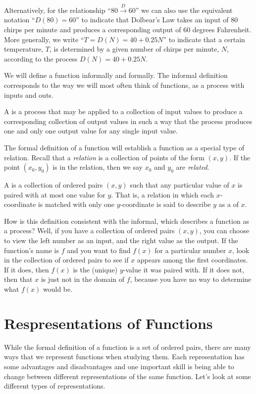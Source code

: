 \documentclass[noauthor, nooutcomes]{ximera}
\begin{document}
Alternatively, for the relationship ``$80 \xrightarrow{D} 60$'' we can also use the equivalent notation ``$D(80) = 60$'' to indicate that Dolbear's Law takes an input of $80$ chirps per minute and produces a corresponding output of $60$ degrees Fahrenheit.  More generally, we write ``$T = D(N) = 40 + 0.25N$'' to indicate that a certain temperature, $T$, is determined by a given number of chirps per minute, $N$, according to the process $D(N) = 40 + 0.25N$.


We will define a function informally and formally.  The informal definition corresponds to the way we will most often think of functions, as a process with inputs and outs.  

\begin{definition}
A  is a process that may be applied to a collection of input values to produce a corresponding collection of output values in such a way that the process produces one and only one output value for any single input value.
\end{definition}

The formal definition of a function will establish a function as a special type of relation.  Recall that a \emph{relation} is a collection of points of the form $(x,y)$.  If the point $(x_0,y_0)$ is in the relation, then we say $x_0$ and $y_0$ are \emph{related}.

\begin{definition}
A  is a collection of ordered pairs $(x,y)$ such that any particular value of $x$ is paired with at most one value for $y$. That is, a relation in which each $x$-coordinate is matched with only one $y$-coordinate is said to describe $y$ as a  of $x$.
\end{definition}

How is this definition consistent with the informal, which describes a function as a process? Well, if you have a collection of ordered pairs $(x,y)$, you can choose to view the left number as an input, and the right value as the output. If the function's name is $f$ and you want to find $f(x)$  for a particular number $x$, look in the collection of ordered pairs to see if $x$ appears among the first coordinates. If it does, then $f(x)$ is the (unique) $y$-value it was paired with. If it does not, then that $x$ is just not in the domain of $f$, because you have no way to determine what $f(x)$ would be.

\section{Respresentations of Functions}
While the formal definition of a function is a set of ordered pairs, there are many ways that we represent functions when studying them.  Each representation has some advantages and disadvantages and one important skill is being able to change between different representations of the same function.  Let's look at some different types of representations.
\end{document}
